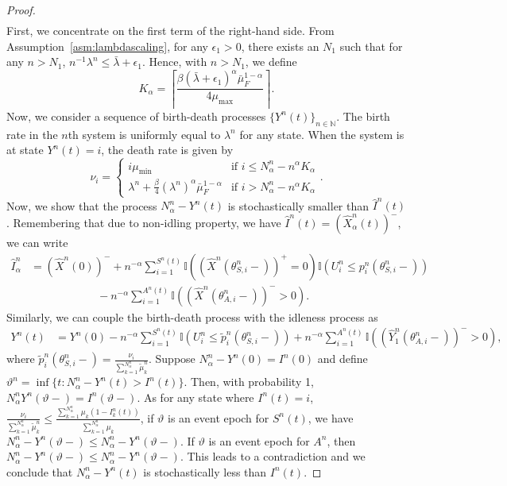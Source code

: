 \documentclass[10pt,a4paper]{amsart}
\newcommand{\II}{\mathbb{I}}
\newcommand{\NN}{\mathbb{N}}
\begin{document}
\begin{proof}
\begin{align}
    \label{eq:bound_uniform_integrability_I}
\end{align}
First, we concentrate on the first term of the right-hand side. From Assumption~\ref{asm:lambdascaling}, for any $\epsilon_1>0$, there exists an $N_1$ such that for any $n>N_1$, $n^{-1}\lambda^n\leq \bar{\lambda}+\epsilon_1$. Hence, with  $n>N_1$, we define 
\[
K_\alpha=\left\lceil \frac{\beta(\bar{\lambda}+\epsilon_1)^\alpha\bar{\mu}_F^{1-\alpha}}{4\mu_{\max}} \right\rceil. 
\]
Now, we consider a sequence of birth-death processes $\{Y^n(t)\}_{n\in \NN}$. The birth rate in the $n$th system is uniformly equal to $\lambda^n$ for any state. When the system is at state $Y^n(t)=i$, the death rate is given by
\begin{equation*}
\nu_i =\left\{\begin{array}{ll} i\mu_{\min}&\mbox{if }i\leq N^n_\alpha-n^{\alpha}K_\alpha\\
\lambda^n+\frac{\beta}{4}(\lambda^n)^{\alpha}\bar{\mu}_F^{1-\alpha} &\mbox{if }i>N^n_\alpha-n^{\alpha}K_\alpha
\end{array}\right..
\end{equation*}
Now, we show that the process $N^n_\alpha-Y^n(t)$ is stochastically smaller than $\hat{I}^n(t)$. Remembering that due to non-idling property, we have  $\hat{I}^n(t)=(\hat{X}_\alpha^n(t))^-$, we can write
\begin{align*}
    \hat{I}_\alpha^n&=  \left(\hat{X}^n(0)\right)^-+n^{-\alpha}\sum_{i=1}^{S^n(t)}\II\left(\left(\hat{X}^n(\theta_{S,i}^n-)\right)^+=0\right)\II\left(U_i^n\leq p_i^n\left(\theta_{S,i}^n-\right)\right)\\&\qquad\qquad\qquad-n^{-\alpha}\sum_{i=1}^{A^n(t)}\II\left( \left(\hat{X}^n(\theta_{A,i}^n-)\right)^->0\right).
\end{align*}
Similarly, we can couple the birth-death process with the idleness process as
\begin{align*}
Y^n(t)&= Y^n(0)-n^{-\alpha}\sum_{i=1}^{S^n(t)}\II\left(U_i^n\leq \tilde{p}_i^n\left(\theta_{S,i}^n-\right)\right)%
+n^{-\alpha}\sum_{i=1}^{A^n(t)}\II\left( \left(\hat{Y}_1^n(\theta_{A,i}^n-)\right)^->0\right),
\end{align*}
where $\tilde{p}_i^n\left(\theta_{S,i}^n-\right)=\frac{\nu_i}{\sum_{k=1}^{N^n_\alpha}\tilde{\mu}_k^n}$. 
Suppose $N^n_\alpha-Y^n(0)=I^n(0)$ and define $\vartheta^n=\inf\{t: N^n_\alpha-Y^n(t)>I^n(t)\}$. 
Then, with probability 1, $N^n_\alpha Y^n(\vartheta-)=I^n(\vartheta-)$. 
As for any state where $I^n(t)=i$, $\frac{\nu_i}{\sum_{k=1}^{N^n_\alpha}\tilde{\mu}_k^n}\leq \frac{\sum_{k=1}^{N^n_\alpha}\mu_k(1-I_k^n(t))}{\sum_{k=1}^{N^n_\alpha}\mu_k}$, if $\vartheta$ is an event epoch for $S^n(t)$, we have $N^n_\alpha-Y^n(\vartheta-)\leq N^n_\alpha-Y^n(\vartheta-)$. If $\vartheta$ is an event epoch for $A^n$, then $N^n_\alpha-Y^n(\vartheta-)\leq N^n_\alpha-Y^n(\vartheta-)$. This leads to a contradiction and we conclude that $N^n_\alpha-Y^n(t)$ is stochastically less than $I^n(t)$. 

\end{proof}
\end{document}
